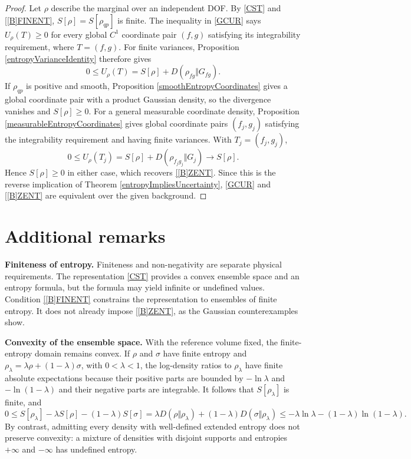 \documentclass{techbrief}
\begin{document}
\begin{proof}
	Let $\rho$ describe the marginal over an independent DOF. By \ref{CST} and \ref{[B]FINENT}, $S[\rho]=S[\rho_{qp}]$ is finite. The inequality in \ref{GCUR} says $U_\rho(T)\geq0$ for every global $C^1$ coordinate pair $(f,g)$ satisfying its integrability requirement, where $T=(f,g)$. For finite variances, Proposition \ref{entropyVarianceIdentity} therefore gives
	\begin{equation*}
		0\leq U_\rho(T)=S[\rho]+D(\rho_{fg}\Vert G_{fg}).
	\end{equation*}
	If $\rho_{qp}$ is positive and smooth, Proposition \ref{smoothEntropyCoordinates} gives a global coordinate pair with a product Gaussian density, so the divergence vanishes and $S[\rho]\geq0$. For a general measurable coordinate density, Proposition \ref{measurableEntropyCoordinates} gives global coordinate pairs $(f_j,g_j)$ satisfying the integrability requirement and having finite variances. With $T_j=(f_j,g_j)$,
	\begin{equation*}
		0\leq U_\rho(T_j)=S[\rho]+D(\rho_{f_jg_j}\Vert G_j)\longrightarrow S[\rho].
	\end{equation*}
	Hence $S[\rho]\geq0$ in either case, which recovers \ref{[B]ZENT}. Since this is the reverse implication of Theorem \ref{entropyImpliesUncertainty}, \ref{GCUR} and \ref{[B]ZENT} are equivalent over the given background.
\end{proof}

\section{Additional remarks}

\textbf{Finiteness of entropy.} Finiteness and non-negativity are separate physical requirements. The representation \ref{CST} provides a convex ensemble space and an entropy formula, but the formula may yield infinite or undefined values. Condition \ref{[B]FINENT} constrains the representation to ensembles of finite entropy. It does not already impose \ref{[B]ZENT}, as the Gaussian counterexamples show.

\textbf{Convexity of the ensemble space.} With the reference volume fixed, the finite-entropy domain remains convex. If $\rho$ and $\sigma$ have finite entropy and $\rho_\lambda=\lambda\rho+(1-\lambda)\sigma$, with $0<\lambda<1$, the log-density ratios to $\rho_\lambda$ have finite absolute expectations because their positive parts are bounded by $-\ln\lambda$ and $-\ln(1-\lambda)$ and their negative parts are integrable. It follows that $S[\rho_\lambda]$ is finite, and
\begin{equation*}
	0\leq S[\rho_\lambda]-\lambda S[\rho]-(1-\lambda)S[\sigma]
	=\lambda D(\rho\Vert\rho_\lambda)+(1-\lambda)D(\sigma\Vert\rho_\lambda)
	\leq-\lambda\ln\lambda-(1-\lambda)\ln(1-\lambda).
\end{equation*}
By contrast, admitting every density with well-defined extended entropy does not preserve convexity: a mixture of densities with disjoint supports and entropies $+\infty$ and $-\infty$ has undefined entropy.
\end{document}
